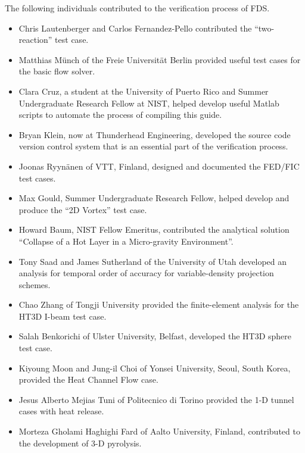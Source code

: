 \documentclass[11pt]{book}
\begin{document}
The following individuals contributed to the verification process of FDS.
\begin{itemize}
\item Chris Lautenberger and Carlos Fernandez-Pello contributed the ``two-reaction'' test case.
\item Matthias M\"{u}nch of the Freie Universit\"{a}t Berlin provided useful test cases for the basic flow solver.
\item Clara Cruz, a student at the University of Puerto Rico and Summer Undergraduate Research Fellow at NIST, helped develop useful Matlab scripts to automate the process of compiling this guide.
\item Bryan Klein, now at Thunderhead Engineering, developed the source code version control system that is an essential part of the verification process.
\item Joonas Ryyn\"{a}nen of VTT, Finland, designed and documented the FED/FIC test cases.
\item Max Gould, Summer Undergraduate Research Fellow, helped develop and produce the ``2D Vortex'' test case.
\item Howard Baum, NIST Fellow Emeritus, contributed the analytical solution ``Collapse of a Hot Layer in a Micro-gravity Environment''.
\item Tony Saad and James Sutherland of the University of Utah developed an analysis for temporal order of accuracy for variable-density projection schemes.
\item Chao Zhang of Tongji University provided the finite-element analysis for the HT3D I-beam test case.
\item Salah Benkorichi of Ulster University, Belfast, developed the HT3D sphere test case.
\item Kiyoung Moon and Jung-il Choi of Yonsei University, Seoul, South Korea, provided the Heat Channel Flow case.
\item Jesus Alberto Mejias Tuni of Politecnico di Torino provided the 1-D tunnel cases with heat release.
\item Morteza Gholami Haghighi Fard of Aalto University, Finland, contributed to the development of 3-D pyrolysis.
\end{itemize}


\cleardoublepage
{}
{}
\tableofcontents

\cleardoublepage
{}
{}
\listoffigures
\end{document}
